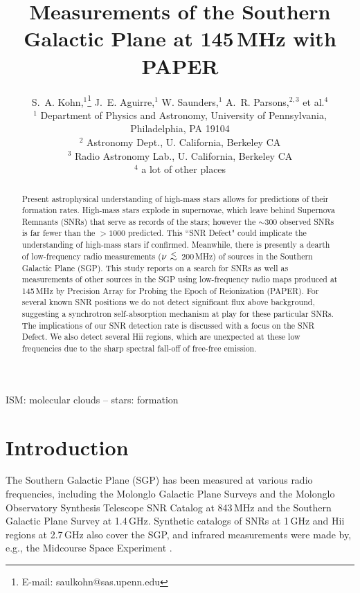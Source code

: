 \documentclass[useAMS,usenatbib]{mn2e}
\title[The SGP at 145\,MHz with PAPER]{Measurements of the Southern Galactic Plane at 145\,MHz with PAPER}
\author[S. A. Kohn et al.]{S.~A. Kohn,$^{1}$\thanks{E-mail: saulkohn@sas.upenn.edu} J.~E. Aguirre,$^{1}$ W. Saunders,$^{1}$
A.~R. Parsons,$^{2,3}$
\newauthor et al.$^4$\\
$^{1}$ Department of Physics and Astronomy, University of Pennsylvania, Philadelphia, PA 19104\\
$^{2}$ Astronomy Dept., U. California, Berkeley CA\\
$^{3}$ Radio Astronomy Lab., U. California, Berkeley CA\\
$^{4}$ a lot of other places\\
}
\newcommand {\aplt} {\ {\raise-.5ex\hbox{$\buildrel<\over\sim$}}\ }
\begin{document}
\date{}

\maketitle
\begin{abstract}
Present astrophysical understanding of high-mass stars allows for predictions of their formation rates.  High-mass stars explode in supernovae, which leave behind Supernova Remnants (SNRs) that serve as records of the stars; however the $\sim$300 observed SNRs is far fewer than the $>1000$ predicted.  This ``SNR Defect" could implicate the understanding of high-mass stars if confirmed. 
Meanwhile, there is presently a dearth of low-frequency radio measurements ($\nu\aplt$200\,MHz) of sources in the Southern Galactic Plane (SGP).
This study reports on a search for SNRs as well as measurements of other sources in the SGP using low-frequency radio maps produced at 145\,MHz by Precision Array for Probing the Epoch of Reionization (PAPER).
For several known SNR positions we do not detect significant flux above background, suggesting a synchrotron self-absorption mechanism at play for these particular SNRs. The implications of our SNR detection rate is discussed with a focus on the SNR Defect. We also detect several H{\sc ii} regions, which are unexpected at these low frequencies due to the sharp spectral fall-off of free-free emission. 
\end{abstract}

\begin{keywords}
ISM: molecular clouds -- stars: formation
\end{keywords}

\section{Introduction}
\label{sec:intro}
The Southern Galactic Plane (SGP) has been measured at various radio frequencies, including the Molonglo Galactic Plane Surveys \citep[MGPS-1 and 2;][]{Green.99,Murphy.07} and the Molonglo Observatory Synthesis Telescope SNR Catalog \citep[MOSTSNRCAT;][]{Whiteoak.96} at 843\,MHz and the Southern Galactic Plane Survey \citep[SGPS;][]{Haverkorn.06} at 1.4\,GHz. Synthetic catalogs of SNRs at 1\,GHz \citep[][hereafter G14]{DAGreen.14} and H{\sc ii} regions at 2.7\,GHz \citep[][hereafter P03]{Paladini.03} also cover the SGP, and infrared measurements were made by, e.g., the Midcourse Space Experiment \citep[MSX;][operating at 8.28--21.3\,$\mu$m (36.23--14.08\,THz)]{Egan.03}. 
\end{document}
